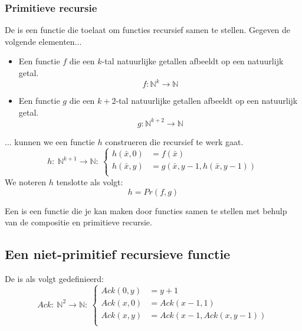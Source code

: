 \documentclass[main.tex]{subfiles}
\begin{document}
\subsubsection{Primitieve recursie}
\label{sec:primitieve-recursie}

\begin{de}
  De  is een functie die toelaat om functies recursief samen te stellen.
  Gegeven de volgende elementen...
  \begin{itemize}
  \item Een functie $f$ die een $k$-tal natuurlijke getallen afbeeldt op een natuurlijk getal.
    \[ f: \mathbb{N}^{k} \rightarrow \mathbb{N} \]
  \item Een functie $g$ die een $k+2$-tal natuurlijke getallen afbeeldt op een natuurlijk getal.
    \[ g: \mathbb{N}^{k+2} \rightarrow \mathbb{N} \]
  \end{itemize}
  ... kunnen we een functie $h$ construeren die recursief te werk gaat.
  \[ 
  h:\ \mathbb{N}^{k+1} \rightarrow \mathbb{N}:\ 
  \left\{
    \begin{array}{ll}
      h(\bar{x},0) &= f(\bar{x})\\
      h(\bar{x},y) &= g(\bar{x}, y-1, h(\bar{x},y-1))\\
    \end{array}
  \right.
  \]
  We noteren $h$ tenslotte als volgt:
  \[ h = Pr(f,g) \]
\end{de}

\begin{de}
  Een  is een functie die je kan maken door functies samen te stellen met behulp van de compositie en primitieve recursie.
\end{de}

\subsection{Een niet-primitief recursieve functie}
\label{sec:een-niet-primitief}

\begin{de}
  De  is als volgt gedefinieerd:
  \[ 
  Ack:\ \mathbb{N}^{2} \rightarrow \mathbb{N}:\ 
  \left\{
    \begin{array}{llll}
      Ack(0,y)   &= y+1\\
      Ack(x,0)   &= Ack(x-1,1)\\
      Ack(x,y)   &= Ack(x-1,Ack(x,y-1))\\
    \end{array}
  \right.
  \]
\end{de}
\end{document}
